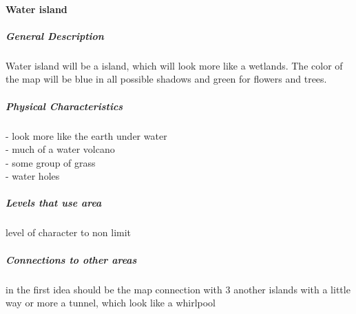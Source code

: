 \documentclass[parskip=full]{scrartcl}
\begin{document}
					\paragraph{Water island}\vspace{-0.5cm}
						\subparagraph{General Description} \vspace{-0.5cm}
							\par \begingroup
							\leftskip=2cm
							\noindent
									Water island will be a island, which will look more like a wetlands. The color of the map will be blue in all possible shadows and green for flowers and trees. 
							\par \endgroup
						\subparagraph{Physical Characteristics} \vspace{-0.5cm}
							\par \begingroup
							\leftskip=2cm
							\noindent
									- look more like the earth under water \\
									- much of a water volcano \\
									- some group of grass \\
									- water holes
							\par \endgroup
						\subparagraph{Levels that use area} \vspace{-0.5cm}
							\par \begingroup
							\leftskip=2cm
							 level of character to non limit
							\par \endgroup
						\subparagraph{Connections to other areas} \vspace{-0.5cm}
							\par \begingroup
							\leftskip=2cm
							\noindent
									in the first idea should be the map connection with 3 another islands with a little way or more a tunnel, which look like a whirlpool
							\par \endgroup
\end{document}
